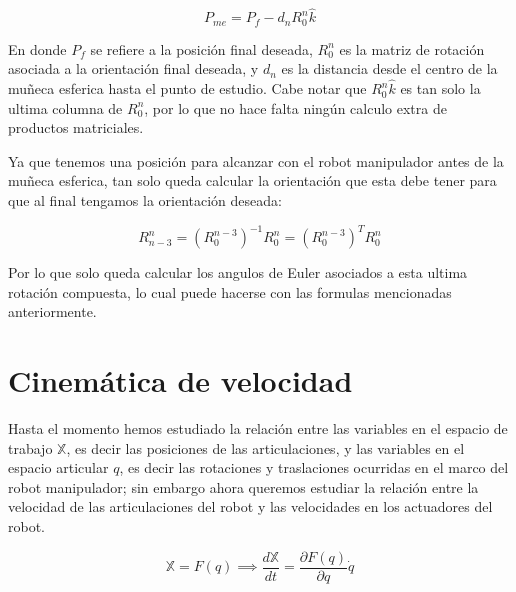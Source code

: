 \begin{multicols*}{3}
            \begin{equation}
                P_{me} = P_f - d_n R_0^n \hat{k}
            \end{equation}

            En donde $P_f$ se refiere a la posición final deseada, $R_0^n$ es la matriz de rotación asociada a la orientación final deseada, y $d_n$ es la distancia desde el centro de la muñeca esferica hasta el punto de estudio. Cabe notar que $R_0^n \hat{k}$ es tan solo la ultima columna de $R_0^n$, por lo que no hace falta ningún calculo extra de productos matriciales.

            Ya que tenemos una posición para alcanzar con el robot manipulador antes de la muñeca esferica, tan solo queda calcular la orientación que esta debe tener para que al final tengamos la orientación deseada:

            \begin{equation}
                R_{n-3}^n = \left( R_0^{n-3} \right)^{-1} R_0^n = \left( R_0^{n-3} \right)^T R_0^n
            \end{equation}

            Por lo que solo queda calcular los angulos de Euler asociados a esta ultima rotación compuesta, lo cual puede hacerse con las formulas mencionadas anteriormente.


    \section{Cinemática de velocidad}

        Hasta el momento hemos estudiado la relación entre las variables en el espacio de trabajo $\mathbb{X}$, es decir las posiciones de las articulaciones, y las variables en el espacio articular $q$, es decir las rotaciones y traslaciones ocurridas en el marco del robot manipulador; sin embargo ahora queremos estudiar la relación entre la velocidad de las articulaciones del robot y las velocidades en los actuadores del robot.

        \begin{equation}
            \mathbb{X} = F(q) \implies \frac{d \mathbb{X}}{dt} = \frac{\partial F(q)}{\partial q} \dot{q}
        \end{equation}


\end{multicols*}
